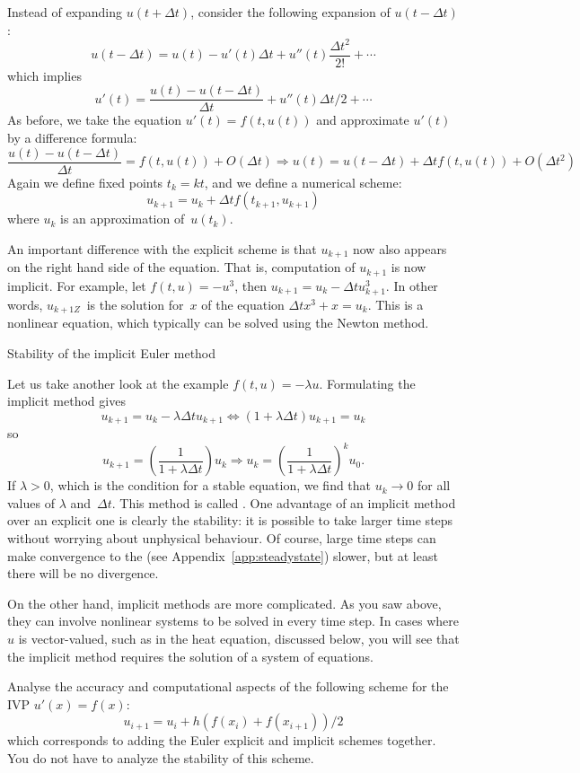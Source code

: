 Instead of expanding $u(t+\Delta t)$, consider the following expansion
of $u(t-\Delta t)$:
\[ u(t-\Delta t)=u(t)-u'(t)\Delta t+u''(t)\frac{\Delta t^2}{2!}+\cdots \]
which implies
\[ u'(t)=\frac{u(t)-u(t-\Delta t)}{\Delta t}+u''(t)\Delta t/2+\cdots
\]
As before, we take the equation $u'(t)=f(t,u(t))$ and
approximate $u'(t)$ by a difference formula:
\[ \frac{u(t)-u(t-\Delta t)}{\Delta t}=f(t,u(t)) +O(\Delta t)
   \Rightarrow u(t)=u(t-\Delta t)+\Delta t f(t,u(t))+O(\Delta t^2)
\]
Again we define fixed points $t_k=kt$,
and we define a numerical scheme:
\[ u_{k+1}=u_k+\Delta tf(t_{k+1},u_{k+1}) \]
where $u_k$ is an approximation of~$u(t_k)$.

An important difference with the explicit scheme is that $u_{k+1}$ now
also appears on the right hand side of the equation. That is,
computation of $u_{k+1}$ is now implicit.
For example, let $f(t,u)=-u^3$, then $u_{k+1}=u_k-\Delta t
u_{k+1}^3$. In other words, $u_{k+1Z}$~is the solution for~$x$ of the
equation $\Delta t x^3+x=u_k$. This is a nonlinear equation, which
typically can be solved using the Newton method.

 {Stability of the implicit Euler method}

Let us take another look at the example $f(t,u)=-\lambda
u$. Formulating the implicit method gives
\[    u_{k+1}=u_k-\lambda \Delta t u_{k+1} \Leftrightarrow
    (1+\lambda\Delta t)u_{k+1}=u_k
\]
so
\[
    u_{k+1}=\left (\frac1{1+\lambda\Delta t}\right)u_k \Rightarrow
    u_k=\left (\frac1{1+\lambda\Delta t}\right)^ku_0.
\]
If $\lambda>0$, which is the condition for a stable equation, we find
that $u_k\rightarrow0$ for all values of $\lambda$ and~$\Delta
t$. This method is called .  One
advantage of an implicit method over an explicit one is clearly
the stability: it is possible to take larger time steps without
worrying about unphysical behaviour. Of course, large time steps can
make convergence to the  (see
Appendix~\ref{app:steadystate}) slower, but at least there will be no
divergence.

On the other hand, implicit methods are more complicated. As you saw
above, they can involve nonlinear systems to be solved in every time step. 
In cases where $u$ is vector-valued, such as in the heat equation,
discussed below, you will see 
that the implicit method requires the solution of a system of
equations.

\begin{exercise}
  Analyse the accuracy and computational aspects of the following
scheme for the IVP $u'(x)=f(x)$:
\[ u_{i+1}=u_i+h(f(x_i)+f(x_{i+1}))/2 \] which corresponds to adding
the Euler explicit and implicit schemes together. You do not have
to analyze the stability of this scheme.
\end{exercise}

